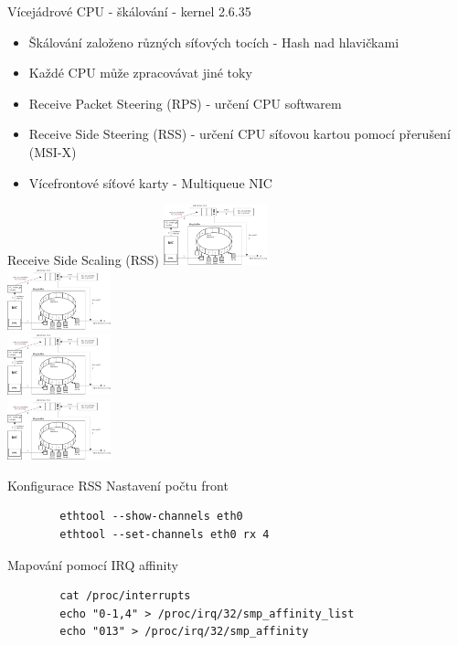 \documentclass{beamer}
\begin{document}
\begin{frame}{Vícejádrové CPU - škálování - kernel 2.6.35}
	\begin{itemize}
		\item Škálování založeno různých síťových tocích - Hash nad hlavičkami
		\item Každé CPU může zpracovávat jiné toky
		\item Receive Packet Steering (RPS) - určení CPU softwarem
		\item Receive Side Steering (RSS) - určení CPU síťovou kartou pomocí přerušení (MSI-X)
		\item Vícefrontové síťové karty - Multiqueue NIC
	\end{itemize}
\end{frame}

\begin{frame}{Receive Side Scaling (RSS)}
	\centering
	\includegraphics[width=3cm,keepaspectratio]{fig/napi-workflow.png} \\
	\includegraphics[width=3cm,keepaspectratio]{fig/napi-workflow.png} \\
	\includegraphics[width=3cm,keepaspectratio]{fig/napi-workflow.png} \\
	\includegraphics[width=3cm,keepaspectratio]{fig/napi-workflow.png}
\end{frame}

\begin{frame}[fragile]{Konfigurace RSS}
	Nastavení počtu front
	\begin{lstlisting}
		ethtool --show-channels eth0
		ethtool --set-channels eth0 rx 4
	\end{lstlisting}
	Mapování pomocí IRQ affinity
	\begin{lstlisting}
		cat /proc/interrupts
		echo "0-1,4" > /proc/irq/32/smp_affinity_list
		echo "013" > /proc/irq/32/smp_affinity
	\end{lstlisting}
\end{frame}
\end{document}

